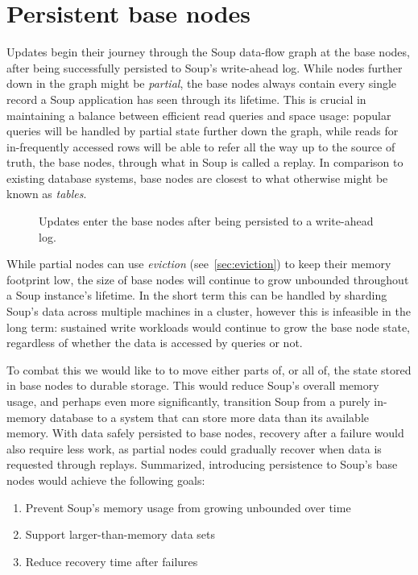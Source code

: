 \chapter{Persistent base nodes}\label{chap:persistent-bases}

Updates begin their journey through the Soup data-flow graph at the base nodes,
after being successfully persisted to Soup's write-ahead log. While nodes
further down in the graph might be \textit{partial}, the base nodes always
contain every single record a Soup application has seen through its lifetime.
This is crucial in maintaining a balance between efficient read queries and
space usage: popular queries will be handled by partial state further down the
graph, while reads for in-frequently accessed rows will be able to refer all the
way up to the source of truth, the base nodes, through what in Soup is called a
replay. In comparison to existing database systems, base nodes are closest to
what otherwise might be known as \textit{tables}.

\begin{figure}[H]
  \centering
  
  \caption{Updates enter the base nodes after being persisted to a write-ahead
  log.}
\end{figure}

While partial nodes can use \textit{eviction} (see~\ref{sec:eviction}) to keep
their memory footprint low, the size of base nodes will continue to grow
unbounded throughout a Soup instance's lifetime. In the short term this can be
handled by sharding Soup's data across multiple machines in a cluster, however
this is infeasible in the long term: sustained write workloads would continue to
grow the base node state, regardless of whether the data is accessed by queries
or not.

To combat this we would like to to move either parts of, or all of, the state
stored in base nodes to durable storage. This would reduce Soup's overall memory
usage, and perhaps even more significantly, transition Soup from a purely
in-memory database to a system that can store more data than its available
memory. With data safely persisted to base nodes, recovery after a failure would
also require less work, as partial nodes could gradually recover when data is
requested through replays. Summarized, introducing persistence to Soup's base
nodes would achieve the following goals:

\begin{enumerate}
  \item Prevent Soup's memory usage from growing unbounded over time
  \item Support larger-than-memory data sets
  \item Reduce recovery time after failures
\end{enumerate}


